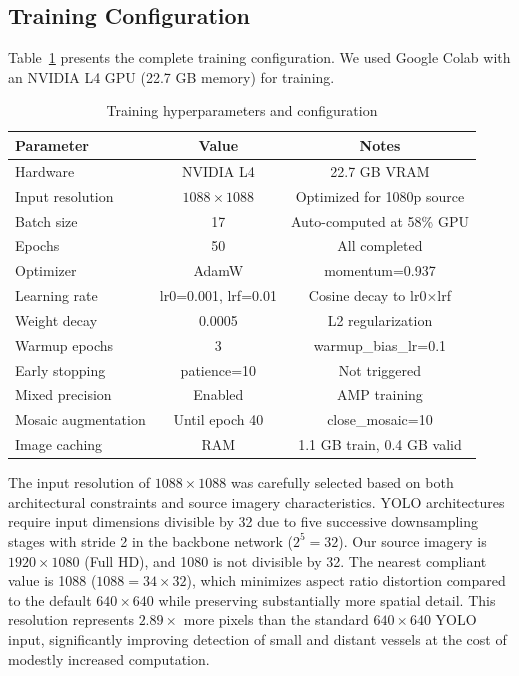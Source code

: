 \documentclass[pdflatex,sn-mathphys-num,Numbered]{sn-jnl}
\begin{document}
\subsection{Training Configuration}\label{subsec:training}

Table~\ref{tab:training} presents the complete training configuration. We used Google Colab with an NVIDIA L4 GPU (22.7 GB memory) for training.

\begin{table}[!ht]
\centering
\caption{Training hyperparameters and configuration}\label{tab:training}
\begin{tabular}{lcc}
\toprule
\textbf{Parameter} & \textbf{Value} & \textbf{Notes} \\
\midrule
Hardware & NVIDIA L4 & 22.7 GB VRAM \\
Input resolution & $1088 \times 1088$ & Optimized for 1080p source \\
Batch size & 17 & Auto-computed at 58\% GPU \\
Epochs & 50 & All completed \\
Optimizer & AdamW & momentum=0.937 \\
Learning rate & lr0=0.001, lrf=0.01 & Cosine decay to lr0$\times$lrf \\
Weight decay & 0.0005 & L2 regularization \\
Warmup epochs & 3 & warmup\_bias\_lr=0.1 \\
Early stopping & patience=10 & Not triggered \\
Mixed precision & Enabled & AMP training \\
Mosaic augmentation & Until epoch 40 & close\_mosaic=10 \\
Image caching & RAM & 1.1 GB train, 0.4 GB valid \\
\bottomrule
\end{tabular}
\end{table}

The input resolution of $1088 \times 1088$ was carefully selected based on both architectural constraints and source imagery characteristics. YOLO architectures require input dimensions divisible by 32 due to five successive downsampling stages with stride 2 in the backbone network ($2^5 = 32$). Our source imagery is $1920 \times 1080$ (Full HD), and 1080 is not divisible by 32. The nearest compliant value is 1088 ($1088 = 34 \times 32$), which minimizes aspect ratio distortion compared to the default $640 \times 640$ while preserving substantially more spatial detail. This resolution represents $2.89\times$ more pixels than the standard $640 \times 640$ YOLO input, significantly improving detection of small and distant vessels at the cost of modestly increased computation.
\end{document}
